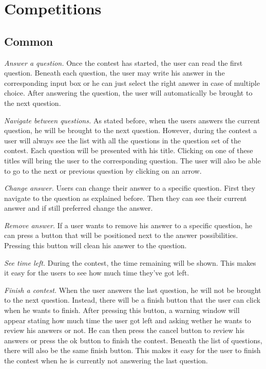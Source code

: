 \section*{Competitions}

\subsection*{Common}

\textit{Answer a question.} 
Once the contest has started, the user can read the first question. Beneath each question, the user may write his answer in the corresponding input box or he can just select the right answer in case of multiple choice. After answering the question, the user will automatically be brought to the next question. 

\textit{Navigate between questions.} 
As stated before, when the users answers the current question, he will be brought to the next question. However, during the contest a user will always see the list with all the questions in the question set of the contest. Each question will be presented with his title. Clicking on one of these titles will bring the user to the corresponding question. The user will also be able to go to the next or previous question by clicking on an arrow. 

\textit{Change answer.} 
Users can change their answer to a specific question. First they navigate to the question as explained before. Then they can see their current answer and if still preferred change the answer. 

\textit{Remove answer.} 
If a user wants to remove his answer to a specific question, he can press a button that will be positioned next to the answer possibilities. Pressing this button will clean his answer to the question. 

\textit{See time left.} 
During the contest, the time remaining will be shown. This makes it easy for the users to see how much time they've got left. 

\textit{Finish a contest.} 
When the user answers the last question, he will not be brought to the next question. Instead, there will be a finish button that the user can click when he wants to finish. After pressing this button, a warning window will appear stating how much time the user got left and asking wether he wants to review his answers or not. He can then press the cancel button to review his answers or press the ok button to finish the contest. Beneath the list of questions, there will also be the same finish button. This makes it easy for the user to finish the contest when he is currently not answering the last question. 

